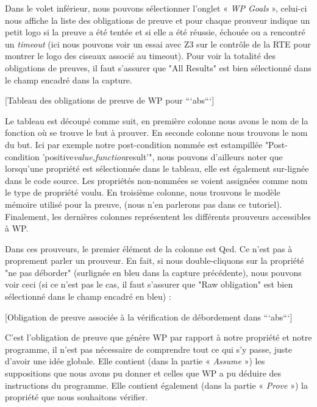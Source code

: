 \documentclass[middle]{zmdocument}
\begin{document}
Dans le volet inférieur, nous pouvons sélectionner l'onglet « \textit{WP Goals} », 
celui-ci nous affiche la liste des obligations de preuve et pour chaque 
prouveur indique un petit logo si la preuve a été tentée et si elle a été 
réussie, échouée ou a rencontré un \textit{timeout} (ici nous pouvons voir un essai 
avec Z3 sur le contrôle de la RTE pour montrer le logo des ciseaux 
associé au timeout). Pour voir la totalité des obligations de preuves, il
faut s'assurer que "All Results" est bien sélectionné dans le champ encadré
dans la capture.



[Tableau des obligations de preuve de WP pour ```abs```]


Le tableau est découpé comme suit, en première colonne nous avons le nom de la
fonction où se trouve le but à prouver. En seconde colonne nous trouvons le nom
du but. Ici par exemple notre post-condition nommée est estampillée 
"Post-condition 'positive\textit{value,function}result'", nous pouvons d'ailleurs noter
que lorsqu'une propriété est sélectionnée dans le tableau, elle est également 
sur-lignée dans le code source. Les propriétés non-nommées se voient assignées
comme nom le type de propriété voulu. En troisième colonne, nous trouvons le 
modèle mémoire utilisé pour la preuve, (nous n'en parlerons pas dans ce 
tutoriel). Finalement, les dernières colonnes représentent les différents 
prouveurs accessibles à WP.



Dans ces prouveurs, le premier élément de la colonne est Qed. Ce n'est pas
à proprement parler un prouveur. En fait, si nous double-cliquons sur la 
propriété "ne pas déborder" (surlignée en bleu dans la capture précédente), 
nous pouvons voir ceci (si ce n'est pas le cas, il faut s'assurer que
"Raw obligation" est bien sélectionné dans le champ encadré en bleu) :



[Obligation de preuve associée à la vérification de débordement dans ```abs```]


C'est l'obligation de preuve que génère WP par rapport à notre propriété et 
notre programme, il n'est pas nécessaire de comprendre tout ce qui s'y passe, 
juste d'avoir une idée globale. Elle contient (dans la partie « \textit{Assume} ») les 
suppositions que nous avons pu donner et celles que WP a pu déduire des 
instructions du programme. Elle contient également (dans la partie « \textit{Prove} ») 
la propriété que nous souhaitons vérifier.
\end{document}
